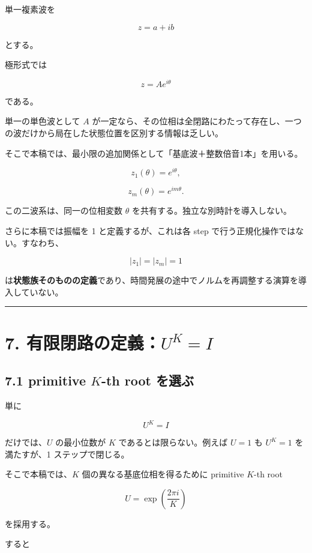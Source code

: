 \documentclass[
  a4paper,
]{ltjsarticle}
\begin{document}
単一複素波を

\[
z
=
a+ib
\]

とする。

極形式では

\[
z
=
A e^{i\theta}
\]

である。

単一の単色波として \(A\)
が一定なら、その位相は全閉路にわたって存在し、一つの波だけから局在した状態位置を区別する情報は乏しい。

そこで本稿では、最小限の追加関係として「基底波＋整数倍音1本」を用いる。

\[
z_1(\theta)
=
e^{i\theta},
\]

\[
z_m(\theta)
=
e^{im\theta}.
\]

この二波系は、同一の位相変数 \(\theta\)
を共有する。独立な別時計を導入しない。

さらに本稿では振幅を 1 と定義するが、これは各 step
で行う正規化操作ではない。すなわち、

\[
|z_1|=|z_m|=1
\]

は\textbf{状態族そのものの定義}であり、時間発展の途中でノルムを再調整する演算を導入していない。

\begin{center}\rule{0.5\linewidth}{0.5pt}\end{center}

\section{\texorpdfstring{7.
有限閉路の定義：\(U^K=I\)}{7. 有限閉路の定義：U\^{}K=I}}\label{ux6709ux9650ux9589ux8defux306eux5b9aux7fa9uki}

\subsection{\texorpdfstring{7.1 primitive \(K\)-th root
を選ぶ}{7.1 primitive K-th root を選ぶ}}\label{primitive-k-th-root-ux3092ux9078ux3076}

単に

\[
U^K=I
\]

だけでは、\(U\) の最小位数が \(K\) であるとは限らない。例えば \(U=1\) も
\(U^K=1\) を満たすが、1 ステップで閉じる。

そこで本稿では、\(K\) 個の異なる基底位相を得るために primitive \(K\)-th
root

\[
U
=
\exp\left(\frac{2\pi i}{K}\right)
\]

を採用する。

すると
\end{document}
